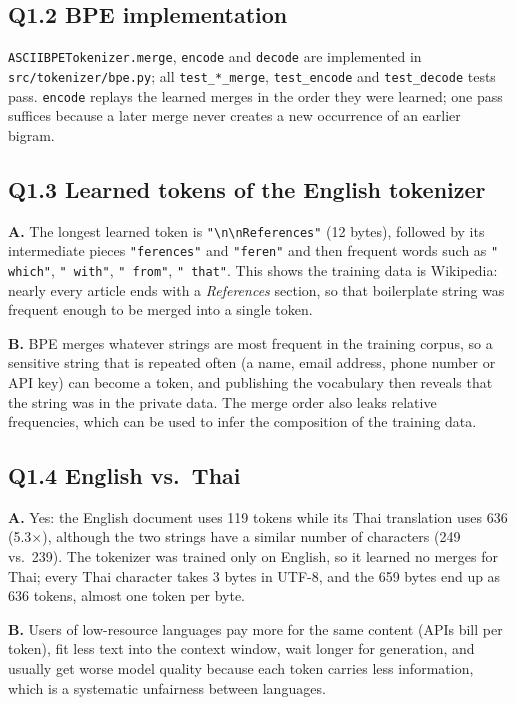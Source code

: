 \documentclass[11pt]{article}
\begin{document}
\subsection*{Q1.2 BPE implementation}
\texttt{ASCIIBPETokenizer.merge}, \texttt{encode} and \texttt{decode} are implemented in \texttt{src/tokenizer/bpe.py}; all \texttt{test\_*\_merge}, \texttt{test\_encode} and \texttt{test\_decode} tests pass. \texttt{encode} replays the learned merges in the order they were learned; one pass suffices because a later merge never creates a new occurrence of an earlier bigram.

\subsection*{Q1.3 Learned tokens of the English tokenizer}
\textbf{A.} The longest learned token is \texttt{"\textbackslash n\textbackslash nReferences"} (12 bytes), followed by its intermediate pieces \texttt{"ferences"} and \texttt{"feren"} and then frequent words such as \texttt{" which"}, \texttt{" with"}, \texttt{" from"}, \texttt{" that"}. This shows the training data is Wikipedia: nearly every article ends with a \emph{References} section, so that boilerplate string was frequent enough to be merged into a single token.

\textbf{B.} BPE merges whatever strings are most frequent in the training corpus, so a sensitive string that is repeated often (a name, email address, phone number or API key) can become a token, and publishing the vocabulary then reveals that the string was in the private data. The merge order also leaks relative frequencies, which can be used to infer the composition of the training data.

\subsection*{Q1.4 English vs.\ Thai}
\textbf{A.} Yes: the English document uses 119 tokens while its Thai translation uses 636 (5.3$\times$), although the two strings have a similar number of characters (249 vs.\ 239). The tokenizer was trained only on English, so it learned no merges for Thai; every Thai character takes 3 bytes in UTF-8, and the 659 bytes end up as 636 tokens, almost one token per byte.

\textbf{B.} Users of low-resource languages pay more for the same content (APIs bill per token), fit less text into the context window, wait longer for generation, and usually get worse model quality because each token carries less information, which is a systematic unfairness between languages.
\end{document}

